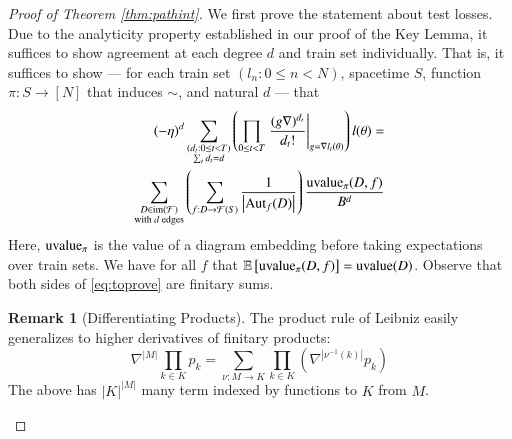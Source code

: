 \documentclass{article}
\theoremstyle{plain}
\theoremstyle{definition}
\newtheorem{rmk}{Remark}
\newcommand{\wrap}[1]{\left(#1\right)}
\newcommand{\wabs}[1]{\left|#1\right|}
\newcommand{\Free}{\mathcal{F}}
\newcommand{\Aut}{\text{\textnormal{Aut}}}
\newcommand{\image}{\text{\textnormal{im}}}
\newcommand{\uvalue}{\text{\textnormal{uvalue}}}
\newcommand{\expct}[1]{\mathbb{E}\left[#1\right]}
\begin{document}
        \begin{proof}[Proof of Theorem \ref{thm:pathint}]
            We first prove the statement about test losses.
            Due to the analyticity property established in our proof of the
            Key Lemma, it suffices to show agreement at each degree $d$ and
            train set individually.  That is, it suffices to show --- for
            each train set $(l_n: 0\leq n<N)$, spacetime $S$, function $\pi:
            S\to [N]$ that induces $\sim$, and natural $d$ --- that
            \begin{align} \label{eq:toprove}
                (-\eta)^d
                \sum_{\substack{
                    (d_t: 0\leq t<T) \\
                    \sum_t d_t = d
                }}
                \wrap{
                    \prod_{0 \leq t < T} \left.
                        \frac{(g \nabla)^{d_t}}{d_t!}
                    \right|_{g=\nabla l_t(\theta)}
                } l (\theta)
                = \nonumber \\
                \sum_{\substack{
                    D \in \image(\Free) \\
                    \textnormal{with $d$ edges}
                }}
                \wrap{
                    \sum_{f: D\to\Free(S)}
                    \frac{1}{\wabs{\Aut_f(D)}}
                }
                \frac{\uvalue_\pi(D, f)}{B^{d}}
            \end{align}
            Here, $\uvalue_\pi$ is the value of a diagram embedding before
            taking expectations over train sets.  We have for all $f$ that
            $\expct{\uvalue_\pi(D, f)} = \uvalue(D)$.
            Observe that both sides of \ref{eq:toprove} are finitary sums.

            \begin{rmk}[Differentiating Products] \label{rmk:leibniz}
                The product rule of Leibniz easily generalizes to higher
                derivatives of finitary products:
                $$
                    \nabla^{\wabs{M}} \prod_{k \in K} p_k
                    = 
                    \sum_{\nu:M\to K} \prod_{k\in K} \wrap{
                        \nabla^{\wabs{\nu^{-1}(k)}} p_k
                    }
                $$
                The above has $\wabs{K}^{\wabs{M}}$ many term indexed by
                functions to $K$ from $M$.
            \end{rmk}


\end{proof}
\end{document}
